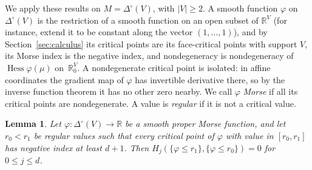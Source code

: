 \documentclass[11pt]{article}
\newtheorem{lemma}[theorem]{Lemma}
\theoremstyle{definition}
\numberwithin{equation}{section}
\newcommand{\R}{\mathbb R}
\DeclareMathOperator{\Hess}{Hess}
\begin{document}
We apply these results on $M=\Delta^\circ(V)$, with $|V|\ge2$. A smooth function $\varphi$ on $\Delta^\circ(V)$ is the restriction of a smooth function on an open subset of $\R^V$ (for instance, extend it to be constant along the vector $(1,\ldots,1)$), and by Section~\ref{sec:calculus} its critical points are its face-critical points with support $V$, its Morse index is the negative index, and nondegeneracy is nondegeneracy of $\Hess\varphi(\mu)$ on~$\R^V_0$. A nondegenerate critical point is isolated: in affine coordinates the gradient map of $\varphi$ has invertible derivative there, so by the inverse function theorem it has no other zero nearby. We call $\varphi$ \emph{Morse} if all its critical points are nondegenerate. A value is \emph{regular} if it is not a critical value.

\begin{lemma}\label{lem:band}
Let $\varphi:\Delta^\circ(V)\to\R$ be a smooth proper Morse function, and let $r_0<r_1$ be regular values such that every critical point of $\varphi$ with value in $[r_0,r_1]$ has negative index at least $d+1$. Then $H_j(\{\varphi\le r_1\},\{\varphi\le r_0\})=0$ for $0\le j\le d$.
\end{lemma}
\end{document}
